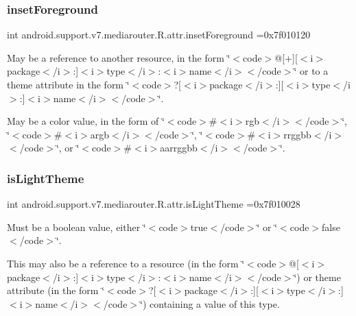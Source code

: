 \subsubsection{\texorpdfstring{inset\+Foreground}{insetForeground}}
{\footnotesize\ttfamily int android.\+support.\+v7.\+mediarouter.\+R.\+attr.\+inset\+Foreground =0x7f010120\hspace{0.3cm}{\ttfamily [static]}}

May be a reference to another resource, in the form \char`\"{}$<$code$>$@\mbox{[}+\mbox{]}\mbox{[}$<$i$>$package$<$/i$>$\+:\mbox{]}$<$i$>$type$<$/i$>$\+:$<$i$>$name$<$/i$>$$<$/code$>$\char`\"{} or to a theme attribute in the form \char`\"{}$<$code$>$?\mbox{[}$<$i$>$package$<$/i$>$\+:\mbox{]}\mbox{[}$<$i$>$type$<$/i$>$\+:\mbox{]}$<$i$>$name$<$/i$>$$<$/code$>$\char`\"{}. 

May be a color value, in the form of \char`\"{}$<$code$>$\#$<$i$>$rgb$<$/i$>$$<$/code$>$\char`\"{}, \char`\"{}$<$code$>$\#$<$i$>$argb$<$/i$>$$<$/code$>$\char`\"{}, \char`\"{}$<$code$>$\#$<$i$>$rrggbb$<$/i$>$$<$/code$>$\char`\"{}, or \char`\"{}$<$code$>$\#$<$i$>$aarrggbb$<$/i$>$$<$/code$>$\char`\"{}. \mbox{\label{classandroid_1_1support_1_1v7_1_1mediarouter_1_1R_1_1attr_a3e0d20450415bcad3b813be70ee05a5a}} 
\subsubsection{\texorpdfstring{is\+Light\+Theme}{isLightTheme}}
{\footnotesize\ttfamily int android.\+support.\+v7.\+mediarouter.\+R.\+attr.\+is\+Light\+Theme =0x7f010028\hspace{0.3cm}{\ttfamily [static]}}

Must be a boolean value, either \char`\"{}$<$code$>$true$<$/code$>$\char`\"{} or \char`\"{}$<$code$>$false$<$/code$>$\char`\"{}. 

This may also be a reference to a resource (in the form \char`\"{}$<$code$>$@\mbox{[}$<$i$>$package$<$/i$>$\+:\mbox{]}$<$i$>$type$<$/i$>$\+:$<$i$>$name$<$/i$>$$<$/code$>$\char`\"{}) or theme attribute (in the form \char`\"{}$<$code$>$?\mbox{[}$<$i$>$package$<$/i$>$\+:\mbox{]}\mbox{[}$<$i$>$type$<$/i$>$\+:\mbox{]}$<$i$>$name$<$/i$>$$<$/code$>$\char`\"{}) containing a value of this type. \mbox{\label{classandroid_1_1support_1_1v7_1_1mediarouter_1_1R_1_1attr_ae9f584ebfd39f6050ec906e88cad7c0c}} 
